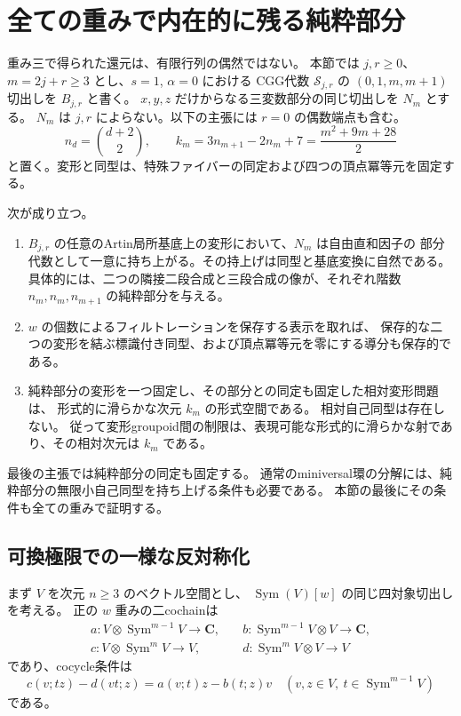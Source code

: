 \section{全ての重みで内在的に残る純粋部分}
\label{sec:vk-all-weights-filtered-v40}

重み三で得られた還元は、有限行列の偶然ではない。
本節では $j,r\ge0$、$m=2j+r\ge3$ とし、$s=1$, $\alpha=0$ における
CGG代数 $\mathcal S_{j,r}$ の $(0,1,m,m+1)$ 切出しを $B_{j,r}$ と書く。
$x,y,z$ だけからなる三変数部分の同じ切出しを $N_m$ とする。
$N_m$ は $j,r$ によらない。以下の主張には $r=0$ の偶数端点も含む。
\[
 n_d=\binom{d+2}{2},\qquad
 k_m=3n_{m+1}-2n_m+7=\frac{m^2+9m+28}{2}
\]
と置く。変形と同型は、特殊ファイバーの同定および四つの頂点冪等元を固定する。

\begin{theorem}[全重みの標準部分と滑らかな相対変形]
\label{thm:vk-all-weights-filtered-v40}
次が成り立つ。
\begin{enumerate}
\item $B_{j,r}$ の任意のArtin局所基底上の変形において、$N_m$ は自由直和因子の
部分代数として一意に持ち上がる。その持上げは同型と基底変換に自然である。
具体的には、二つの隣接二段合成と三段合成の像が、それぞれ階数
$n_m,n_m,n_{m+1}$ の純粋部分を与える。
\item $w$ の個数によるフィルトレーションを保存する表示を取れば、
保存的な二つの変形を結ぶ標識付き同型、および頂点冪等元を零にする導分も保存的である。
\item 純粋部分の変形を一つ固定し、その部分との同定も固定した相対変形問題は、
形式的に滑らかな次元 $k_m$ の形式空間である。
相対自己同型は存在しない。
従って変形groupoid間の制限は、表現可能な形式的に滑らかな射であり、その相対次元は $k_m$ である。
\end{enumerate}
\end{theorem}

最後の主張では純粋部分の同定も固定する。
通常のminiversal環の分解には、純粋部分の無限小自己同型を持ち上げる条件も必要である。
本節の最後にその条件も全ての重みで証明する。

\subsection{可換極限での一様な反対称化}

まず $V$ を次元 $n\ge3$ のベクトル空間とし、
$\operatorname{Sym}(V)[w]$ の同じ四対象切出しを考える。
正の $w$ 重みの二cochainは
\[
 \begin{split}
 a:V\otimes\operatorname{Sym}^{m-1}V\to\mathbf C,&\quad
 b:\operatorname{Sym}^{m-1}V\otimes V\to\mathbf C,\\
 c:V\otimes\operatorname{Sym}^{m}V\to V,&\quad
 d:\operatorname{Sym}^{m}V\otimes V\to V
 \end{split}
\]
であり、cocycle条件は
\begin{equation}
 c(v;t z)-d(vt;z)=a(v;t)z-b(t;z)v
 \quad (v,z\in V,\ t\in\operatorname{Sym}^{m-1}V)
 \label{eq:all-weight-positive-cocycle-v40}
\end{equation}
である。


